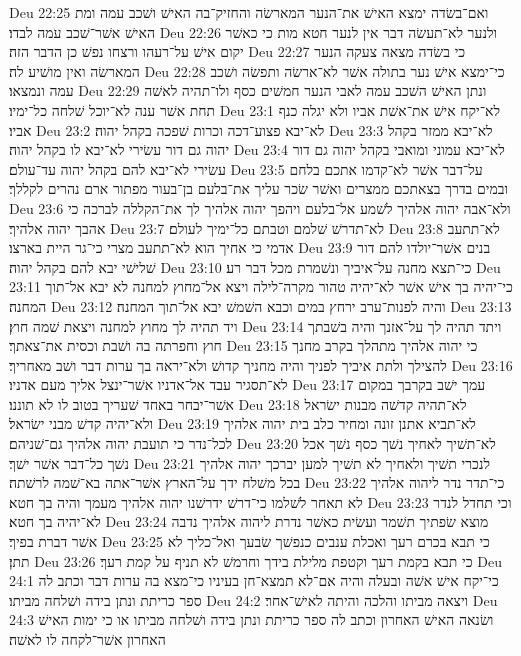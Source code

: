 Deu 22:25  ואם־בשׂדה ימצא האישׁ את־הנער המארשׂה והחזיק־בה האישׁ ושׁכב עמה ומת האישׁ אשׁר־שׁכב עמה לבדו׃
Deu 22:26  ולנער לא־תעשׂה דבר אין לנער חטא מות כי כאשׁר יקום אישׁ על־רעהו ורצחו נפשׁ כן הדבר הזה׃
Deu 22:27  כי בשׂדה מצאה צעקה הנער המארשׂה ואין מושׁיע לה׃
Deu 22:28  כי־ימצא אישׁ נער בתולה אשׁר לא־ארשׂה ותפשׂה ושׁכב עמה ונמצאו׃
Deu 22:29  ונתן האישׁ השׁכב עמה לאבי הנער חמשׁים כסף ולו־תהיה לאשׁה תחת אשׁר ענה לא־יוכל שׁלחה כל־ימיו׃
Deu 23:1  לא־יקח אישׁ את־אשׁת אביו ולא יגלה כנף אביו׃
Deu 23:2  לא־יבא פצוע־דכה וכרות שׁפכה בקהל יהוה׃
Deu 23:3  לא־יבא ממזר בקהל יהוה גם דור עשׂירי לא־יבא לו בקהל יהוה׃
Deu 23:4  לא־יבא עמוני ומואבי בקהל יהוה גם דור עשׂירי לא־יבא להם בקהל יהוה עד־עולם׃
Deu 23:5  על־דבר אשׁר לא־קדמו אתכם בלחם ובמים בדרך בצאתכם ממצרים ואשׁר שׂכר עליך את־בלעם בן־בעור מפתור ארם נהרים לקללך׃
Deu 23:6  ולא־אבה יהוה אלהיך לשׁמע אל־בלעם ויהפך יהוה אלהיך לך את־הקללה לברכה כי אהבך יהוה אלהיך׃
Deu 23:7  לא־תדרשׁ שׁלמם וטבתם כל־ימיך לעולם׃
Deu 23:8  לא־תתעב אדמי כי אחיך הוא לא־תתעב מצרי כי־גר היית בארצו׃
Deu 23:9  בנים אשׁר־יולדו להם דור שׁלישׁי יבא להם בקהל יהוה׃
Deu 23:10  כי־תצא מחנה על־איביך ונשׁמרת מכל דבר רע׃
Deu 23:11  כי־יהיה בך אישׁ אשׁר לא־יהיה טהור מקרה־לילה ויצא אל־מחוץ למחנה לא יבא אל־תוך המחנה׃
Deu 23:12  והיה לפנות־ערב ירחץ במים וכבא השׁמשׁ יבא אל־תוך המחנה׃
Deu 23:13  ויד תהיה לך מחוץ למחנה ויצאת שׁמה חוץ׃
Deu 23:14  ויתד תהיה לך על־אזנך והיה בשׁבתך חוץ וחפרתה בה ושׁבת וכסית את־צאתך׃
Deu 23:15  כי יהוה אלהיך מתהלך בקרב מחנך להצילך ולתת איביך לפניך והיה מחניך קדושׁ ולא־יראה בך ערות דבר ושׁב מאחריך׃
Deu 23:16  לא־תסגיר עבד אל־אדניו אשׁר־ינצל אליך מעם אדניו׃
Deu 23:17  עמך ישׁב בקרבך במקום אשׁר־יבחר באחד שׁעריך בטוב לו לא תוננו׃
Deu 23:18  לא־תהיה קדשׁה מבנות ישׂראל ולא־יהיה קדשׁ מבני ישׂראל׃
Deu 23:19  לא־תביא אתנן זונה ומחיר כלב בית יהוה אלהיך לכל־נדר כי תועבת יהוה אלהיך גם־שׁניהם׃
Deu 23:20  לא־תשׁיך לאחיך נשׁך כסף נשׁך אכל נשׁך כל־דבר אשׁר ישׁך׃
Deu 23:21  לנכרי תשׁיך ולאחיך לא תשׁיך למען יברכך יהוה אלהיך בכל משׁלח ידך על־הארץ אשׁר־אתה בא־שׁמה לרשׁתה׃
Deu 23:22  כי־תדר נדר ליהוה אלהיך לא תאחר לשׁלמו כי־דרשׁ ידרשׁנו יהוה אלהיך מעמך והיה בך חטא׃
Deu 23:23  וכי תחדל לנדר לא־יהיה בך חטא׃
Deu 23:24  מוצא שׂפתיך תשׁמר ועשׂית כאשׁר נדרת ליהוה אלהיך נדבה אשׁר דברת בפיך׃
Deu 23:25  כי תבא בכרם רעך ואכלת ענבים כנפשׁך שׂבעך ואל־כליך לא תתן׃
Deu 23:26  כי תבא בקמת רעך וקטפת מלילת בידך וחרמשׁ לא תניף על קמת רעך׃
Deu 24:1  כי־יקח אישׁ אשׁה ובעלה והיה אם־לא תמצא־חן בעיניו כי־מצא בה ערות דבר וכתב לה ספר כריתת ונתן בידה ושׁלחה מביתו׃
Deu 24:2  ויצאה מביתו והלכה והיתה לאישׁ־אחר׃
Deu 24:3  ושׂנאה האישׁ האחרון וכתב לה ספר כריתת ונתן בידה ושׁלחה מביתו או כי ימות האישׁ האחרון אשׁר־לקחה לו לאשׁה׃
